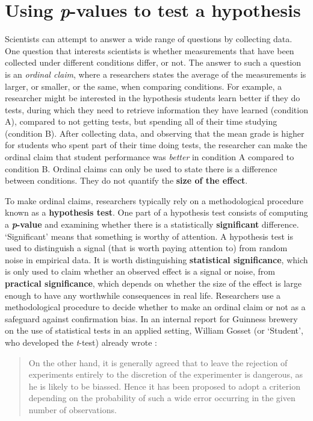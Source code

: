 \documentclass[
  oneside]{book}
\begin{document}
\hypertarget{pvalue}{%
\chapter{\texorpdfstring{Using \emph{p}-values to test a hypothesis}{Using p-values to test a hypothesis}}\label{pvalue}}

Scientists can attempt to answer a wide range of questions by collecting data. One question that interests scientists is whether measurements that have been collected under different conditions differ, or not. The answer to such a question is an \emph{ordinal claim}, where a researchers states the average of the measurements is larger, or smaller, or the same, when comparing conditions. For example, a researcher might be interested in the hypothesis students learn better if they do tests, during which they need to retrieve information they have learned (condition A), compared to not getting tests, but spending all of their time studying (condition B). After collecting data, and observing that the mean grade is higher for students who spent part of their time doing tests, the researcher can make the ordinal claim that student performance was \emph{better} in condition A compared to condition B. Ordinal claims can only be used to state there is a difference between conditions. They do not quantify the \textbf{size of the effect}.

To make ordinal claims, researchers typically rely on a methodological procedure known as a \textbf{hypothesis test}. One part of a hypothesis test consists of computing a \textbf{\emph{p}-value} and examining whether there is a statistically \textbf{significant} difference. `Significant' means that something is worthy of attention. A hypothesis test is used to distinguish a signal (that is worth paying attention to) from random noise in empirical data. It is worth distinguishing \textbf{statistical significance}, which is only used to claim whether an observed effect is a signal or noise, from \textbf{practical significance}, which depends on whether the size of the effect is large enough to have any worthwhile consequences in real life. Researchers use a methodological procedure to decide whether to make an ordinal claim or not as a safeguard against confirmation bias. In an internal report for Guinness brewery on the use of statistical tests in an applied setting, William Gosset (or `Student', who developed the \emph{t}-test) already wrote \citeyearpar{gosset_application_1904}:

\begin{quote}
On the other hand, it is generally agreed that to leave the rejection of experiments entirely to the discretion of the experimenter is dangerous, as he is likely to be biassed. Hence it has been proposed to adopt a criterion depending on the probability of such a wide error occurring in the given number of observations.
\end{quote}
\end{document}
